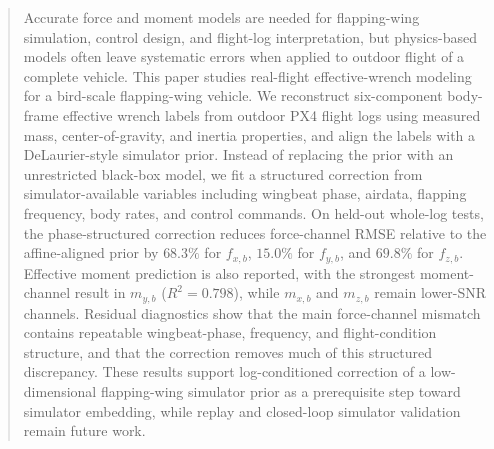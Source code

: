 \begin{abstract}
Accurate force and moment models are needed for flapping-wing simulation, control design, and flight-log interpretation, but physics-based models often leave systematic errors when applied to outdoor flight of a complete vehicle. This paper studies real-flight effective-wrench modeling for a bird-scale flapping-wing vehicle. We reconstruct six-component body-frame effective wrench labels from outdoor PX4 flight logs using measured mass, center-of-gravity, and inertia properties, and align the labels with a DeLaurier-style simulator prior. Instead of replacing the prior with an unrestricted black-box model, we fit a structured correction from simulator-available variables including wingbeat phase, airdata, flapping frequency, body rates, and control commands. On held-out whole-log tests, the phase-structured correction reduces force-channel RMSE relative to the affine-aligned prior by $68.3\%$ for $f_{x,b}$, $15.0\%$ for $f_{y,b}$, and $69.8\%$ for $f_{z,b}$. Effective moment prediction is also reported, with the strongest moment-channel result in $m_{y,b}$ ($R^2=0.798$), while $m_{x,b}$ and $m_{z,b}$ remain lower-SNR channels. Residual diagnostics show that the main force-channel mismatch contains repeatable wingbeat-phase, frequency, and flight-condition structure, and that the correction removes much of this structured discrepancy. These results support log-conditioned correction of a low-dimensional flapping-wing simulator prior as a prerequisite step toward simulator embedding, while replay and closed-loop simulator validation remain future work.
\end{abstract}

